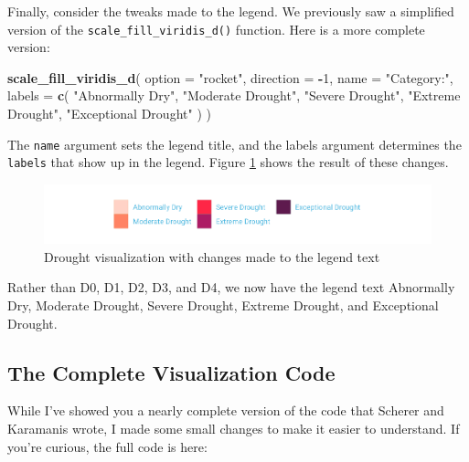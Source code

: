 \documentclass[
]{book}
\newenvironment{Shaded}{\begin{snugshade}}{\end{snugshade}}
\newcommand{\AttributeTok}[1]{\textcolor[rgb]{0.13,0.29,0.53}{#1}}
\newcommand{\DecValTok}[1]{\textcolor[rgb]{0.00,0.00,0.81}{#1}}
\newcommand{\FunctionTok}[1]{\textcolor[rgb]{0.13,0.29,0.53}{\textbf{#1}}}
\newcommand{\NormalTok}[1]{#1}
\newcommand{\SpecialCharTok}[1]{\textcolor[rgb]{0.81,0.36,0.00}{\textbf{#1}}}
\newcommand{\StringTok}[1]{\textcolor[rgb]{0.31,0.60,0.02}{#1}}
\begin{document}
Finally, consider the tweaks made to the legend. We previously saw a simplified version of the \texttt{scale\_fill\_viridis\_d()} function. Here is a more complete version:

\begin{Shaded}
\begin{Highlighting}[]
\FunctionTok{scale\_fill\_viridis\_d}\NormalTok{(}
  \AttributeTok{option =} \StringTok{"rocket"}\NormalTok{,}
  \AttributeTok{direction =} \SpecialCharTok{{-}}\DecValTok{1}\NormalTok{,}
  \AttributeTok{name =} \StringTok{"Category:"}\NormalTok{,}
  \AttributeTok{labels =} \FunctionTok{c}\NormalTok{(}
    \StringTok{"Abnormally Dry"}\NormalTok{,}
    \StringTok{"Moderate Drought"}\NormalTok{,}
    \StringTok{"Severe Drought"}\NormalTok{,}
    \StringTok{"Extreme Drought"}\NormalTok{,}
    \StringTok{"Exceptional Drought"}
\NormalTok{  )}
\NormalTok{)}
\end{Highlighting}
\end{Shaded}

The \texttt{name} argument sets the legend title, and the labels argument determines the \texttt{labels} that show up in the legend. Figure \ref{fig:drought-viz-legend-tweaks} shows the result of these changes.

\begin{figure}
\includegraphics[width=1\linewidth]{data-viz_files/figure-latex/drought-viz-legend-tweaks-1} \caption{Drought visualization with changes made to the legend text}\label{fig:drought-viz-legend-tweaks}
\end{figure}

Rather than D0, D1, D2, D3, and D4, we now have the legend text Abnormally Dry, Moderate Drought, Severe Drought, Extreme Drought, and Exceptional Drought.

\hypertarget{the-complete-visualization-code}{%
\subsection*{The Complete Visualization Code}\label{the-complete-visualization-code}}

While I've showed you a nearly complete version of the code that Scherer and Karamanis wrote, I made some small changes to make it easier to understand. If you're curious, the full code is here:
\end{document}
